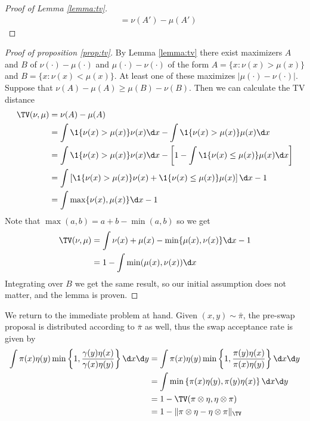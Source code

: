 \documentclass{article}
\begin{document}
\begin{enumerate}
\begin{proof}[Proof of Lemma \ref{lemma:tv}]
\begin{align}
            &= \nu(A') - \mu(A')
        \end{align}
    \end{proof}
    \begin{proof}[Proof of proposition \ref{prop:tv}]
        By Lemma \ref{lemma:tv} there exist maximizers $A$ and $B$ of
        $\nu(\cdot)-\mu(\cdot)$ and $\mu(\cdot) - \nu(\cdot)$ of the form 
        $A = \{ x: \nu(x) > \mu(x) \}$ and $B = \{ x : \nu(x) < \mu(x) \}$.
        At least one of
        these maximizes $|\mu(\cdot) - \nu(\cdot)|$. Suppose that
        $\nu(A) - \mu(A) \geq \mu(B) - \nu(B)$. Then we can calculate the TV
        distance
        \begin{align}
            \TV(\nu,\mu) &= \nu(A) - \mu(A) \\
                &= \int \1\{ \nu(x) > \mu(x) \} \nu(x) \d x
                - \int \1\{ \nu(x) > \mu(x) \} \mu(x) \d x \\
                &= \int \1\{ \nu(x) > \mu(x) \} \nu(x) \d x
                - \left[ 1 - \int \1\{ \nu(x) \leq \mu(x) \} \mu(x) \d x \right] \\
                &= \int \left[\1\{ \nu(x) > \mu(x) \} \nu(x) + \1\{ \nu(x) \leq \mu(x) \} \mu(x)
                \right] \d x - 1 \\
                &= \int \max\{ \nu(x), \mu(x) \} \d x - 1
        \end{align}
        Note that $\max(a,b) = a + b - \min(a,b)$ so we get
        \begin{align}
            \TV(\nu, \mu) &= \int \nu(x) + \mu(x) - \min\{ \mu(x), \nu(x) \} \d x - 1 \\
            &= 1- \int \min(\mu(x), \nu(x)) \d x
        \end{align}
        Integrating over $B$ we get the same result, so our initial assumption does
        not matter, and the lemma is proven.
        \end{proof}
        We return to the immediate problem at hand. Given $(x,y) \sim \bar \pi$,
        the pre-swap proposal is distributed according to $\bar \pi$ as well, thus
        the swap acceptance rate is given by
        \begin{align}
            \int \pi(x)\eta(y)\min\left\{1, \frac{\gamma(y)\eta(x)}{\gamma(x)\eta(y)} \right\}  \d x \d y
            &= \int \pi(x)\eta(y)\min\left\{1, \frac{\pi(y)\eta(x)}{\pi(x)\eta(y)} \right\} \d x \d y  \\
            &= \int \min\left\{ \pi(x)\eta(y), \pi(y)\eta(x)\right\} \d x \d y \\
            &= 1- \TV(\pi \otimes \eta, \eta \otimes \pi) \\
            &= 1 - \|\pi \otimes \eta - \eta \otimes \pi \|_{\TV}
        \end{align}
\end{enumerate}
\end{document}
